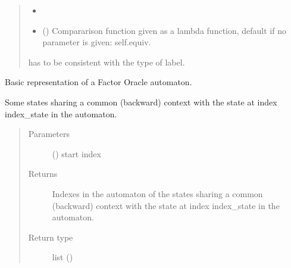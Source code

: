 \documentclass[letterpaper,10pt,english]{sphinxmanual}
\begin{document}
\begin{fulllineitems}
\begin{fulllineitems}
\begin{quote}
\begin{description}
\begin{itemize}
\item {} 
 \textendash{} 

\item {} 
 () \textendash{} Compararison function given as a lambda function, default if no parameter is given: self.equiv.

\end{itemize}

\item[{!}] \leavevmode
{} has to be consistent with the type of label.

\end{description}\end{quote}

\end{fulllineitems}


\begin{fulllineitems}
\label{\detokenize{index:Model.FactorOracle.print_model}}
Basic representation of a Factor Oracle automaton.

\end{fulllineitems}


\begin{fulllineitems}
\label{\detokenize{index:Model.FactorOracle.similar_backward_context}}
Some states sharing a common (backward) context with the state at index index\_state in the automaton.
\begin{quote}\begin{description}
\item[{Parameters}] \leavevmode
{} () \textendash{} start index

\item[{Returns}] \leavevmode
Indexes in the automaton of the states sharing a common (backward) context with the state at index index\_state in the automaton.

\item[{Return type}] \leavevmode
list ()


\end{description}
\end{quote}
\end{fulllineitems}
\end{fulllineitems}
\end{document}

